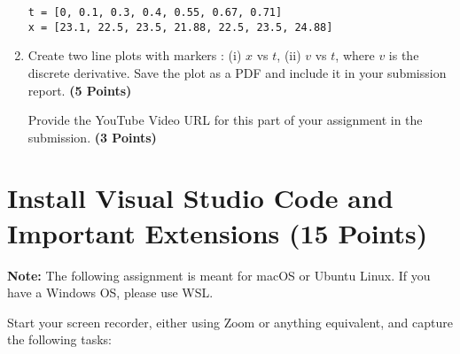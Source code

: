 \documentclass[12pt, xcolor=dvipsnames,svgnames,x11names]{article}
\begin{document}
\begin{enumerate}
\begin{verbatim}
t = [0, 0.1, 0.3, 0.4, 0.55, 0.67, 0.71]
x = [23.1, 22.5, 23.5, 21.88, 22.5, 23.5, 24.88]
\end{verbatim}

\item Create two line plots with markers : (i) $x$ vs $t$, (ii) $v$ vs $t$, where $v$ is the discrete derivative. Save the plot as a PDF and include it in your submission report. \hfill \textbf{(5 Points)}

Provide the YouTube Video URL for this part of your assignment in the submission. \hfill \textbf{(3 Points)}

\end{enumerate}

\section{Install Visual Studio Code and Important Extensions (15 Points)}

\textbf{Note:} The following assignment is meant for macOS or Ubuntu Linux. If you have a Windows OS, please use WSL.

Start your screen recorder, either using Zoom or anything equivalent, and capture the following tasks:
\end{document}
